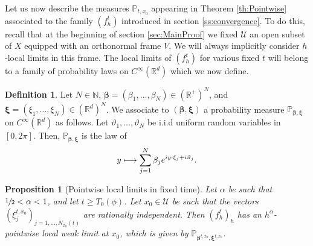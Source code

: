 \documentclass[10pt]{amsart}
\let\mathcal\mathscr
\newcommand\mto{\mathchoice{\longmapsto}{\mapsto}{\mapsto}{\mapsto}}
\theoremstyle{plain}
\newtheorem{proposition}[theorem]{Proposition}
\theoremstyle{definition}
\newtheorem{definition}[theorem]{Definition}
\newcommand{\N}{\mathbb{N}}
\newcommand{\R}{\mathbb{R}}
\def\calU{\mathcal{U}}
\begin{document}
Let us now describe the measures $\mathbb{P}_{t,x_0}$ appearing in Theorem \ref{th:Pointwise} associated to the family $(f_h^t)$ introduced in section \ref{ss:convergence}. To do this, recall that at the beginning of section \ref{sec:MainProof} we fixed $\calU$ an open subset of $X$ equipped with an orthonormal frame $V$. We will always implicitly consider $h$-local limits in this frame. The local limits of $(f_h^t)$ for various fixed $t$ will belong to a family of probability laws on $C^\infty(\R^d)$ which we now define.\enlargethispage{.5\baselineskip}%

\begin{definition}\label{def:rpws}
Let $N\in \N$, $\boldsymbol{\beta}= (\beta_1,\dots,\beta_N)\in \left(\R^+\right)^N$, and $\boldsymbol{\xi} =(\xi_1,\dots, \xi_N) \in \left(\R^d\right)^N$. We associate to $(\boldsymbol{\beta}, \boldsymbol{\xi})$ a probability measure $\mathbb{P}_{\boldsymbol{\beta},\boldsymbol{\xi}}$ on $C^\infty(\R^d)$ as follows. Let $\vartheta_1,\dots,\vartheta_N$ be i.i.d uniform random variables in $[0,2\pi]$. Then, $\mathbb{P}_{\boldsymbol{\beta},\boldsymbol{\xi}}$ is the law of\vspace*{-3pt}
\[
y\mto\sum_{j=1}^N\beta_je^{iy\cdot\xi_j+i\vartheta_j}.
\]
\end{definition}

\begin{proposition}[Pointwise local limits in fixed time]\label{prop:LWSumLag}
Let $\alpha$ be such that \hbox{$\sfrac{1}{2}<\alpha<1$}, and let $t\geq T_0(\phi)$. Let $x_0\in\calU$ be such that the vectors $(\xi_j^{t,x_0})_{j=1,\dots,N_{x_0}(t)}$ are rationally independent. Then $(f_h^t)_h$ has an $h^\alpha$-pointwise local weak limit at $x_0$, which is given by $\mathbb{P}_{\boldsymbol{\beta}^{t,x_0}, \boldsymbol{\xi}^{t,x_0}}$.
\end{proposition}
\end{document}
